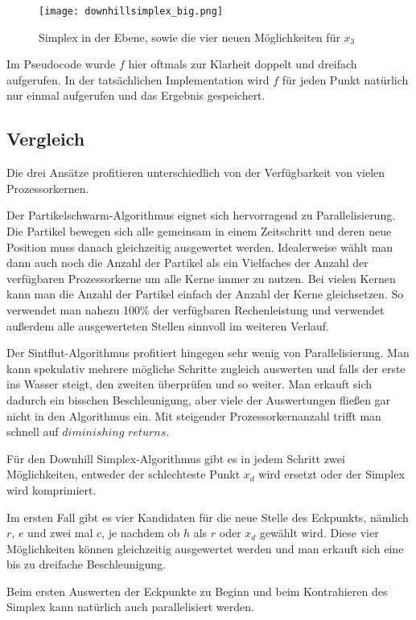 \documentclass[a4paper,12pt]{article}
\begin{document}
\begin{figure}[h]
\texttt{[image: downhillsimplex\_big.png]}
\caption{Simplex in der Ebene, sowie die vier neuen Möglichkeiten für $x_3$}
\end{figure}

Im Pseudocode wurde $f$ hier oftmals zur Klarheit doppelt und dreifach aufgerufen. In der tatsächlichen Implementation wird $f$ für jeden Punkt natürlich nur einmal aufgerufen und das Ergebnis gespeichert.


\subsection{Vergleich}

Die drei Ansätze profitieren unterschiedlich von der Verfügbarkeit von vielen Prozessorkernen. 

Der Partikelschwarm-Algorithmus eignet sich hervorragend zu Parallelisierung. Die Partikel bewegen sich alle gemeinsam in einem Zeitschritt und deren neue Position muss danach gleichzeitig ausgewertet werden. Idealerweise wählt man dann auch noch die Anzahl der Partikel als ein Vielfaches der Anzahl der verfügbaren Prozessorkerne um alle Kerne immer zu nutzen. Bei vielen Kernen kann man die Anzahl der Partikel einfach der Anzahl der Kerne gleichsetzen. So verwendet man nahezu 100\% der verfügbaren Rechenleistung und verwendet außerdem alle ausgewerteten Stellen sinnvoll im weiteren Verlauf.

Der Sintflut-Algorithmus profitiert hingegen sehr wenig von Parallelisierung. Man kann spekulativ mehrere mögliche Schritte zugleich auswerten und falls der erste ins Wasser steigt, den zweiten überprüfen und so weiter. Man erkauft sich dadurch ein bisschen Beschleunigung, aber viele der Auswertungen fließen gar nicht in den Algorithmus ein. Mit steigender Prozessorkernanzahl trifft man schnell auf $diminishing$ $returns$.

Für den Downhill Simplex-Algorithmus gibt es in jedem Schritt zwei Möglichkeiten, entweder der schlechteste Punkt $x_d$ wird ersetzt oder der Simplex wird komprimiert.

Im ersten Fall gibt es vier Kandidaten für die neue Stelle des Eckpunkts, nämlich $r$, $e$ und zwei mal $c$, je nachdem ob $h$ als $r$ oder $x_d$ gewählt wird. Diese vier Möglichkeiten können gleichzeitig ausgewertet werden und man erkauft sich eine bis zu dreifache Beschleunigung. 

Beim ersten Auswerten der Eckpunkte zu Beginn und beim Kontrahieren des Simplex kann natürlich auch parallelisiert werden.
\end{document}
